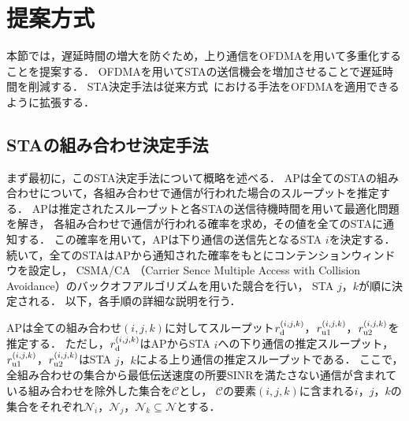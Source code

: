 \documentclass[technicalreport]{ieicej}
\newcommand{\sij}{(i,j)}
\newcommand{\sijk}{(i,j,k)}
\newcommand{\rijk}{r^{(i,j,k)}}
\newcommand{\mthc}{\mathcal C}
\newcommand{\mthni}{{\mathcal N}_i}
\newcommand{\mthnj}{{\mathcal N}_j}
\newcommand{\mthnk}{{\mathcal N}_k}
\def\coloneqq{\mathrel{\mathop:}=}
\begin{document}
\section{提案方式}\label{sec:propose}
	本節では，遅延時間の増大を防ぐため，上り通信をOFDMAを用いて多重化することを提案する．
	OFDMAを用いてSTAの送信機会を増加させることで遅延時間を削減する．
	STA決定手法は従来方式~\cite{promac_fair}における手法をOFDMAを適用できるように拡張する．
	\subsection{STAの組み合わせ決定手法}\label{sec:opt}
		まず最初に，このSTA決定手法について概略を述べる．
		APは全てのSTAの組み合わせについて，各組み合わせで通信が行われた場合のスループットを推定する．
		APは推定されたスループットと各STAの送信待機時間を用いて最適化問題を解き，
		各組み合わせで通信が行われる確率を求め，その値を全てのSTAに通知する．
		この確率を用いて，APは下り通信の送信先となるSTA $i$を決定する．
		続いて，全てのSTAはAPから通知された確率をもとにコンテンションウィンドウを設定し，
		CSMA/CA （Carrier Sence Multiple Access with Collision Avoidance）のバックオフアルゴリズムを用いた競合を行い，
		STA $j$，$k$が順に決定される．
		以下，各手順の詳細な説明を行う．
		\par
		APは全ての組み合わせ$(i,j,k)$に対してスループット$r^{(i,j,k)}_{\rm d}$，$r^{(i,j,k)}_{\rm u1}$，$r^{(i,j,k)}_{\rm u2}$を推定する．
		ただし，$r^{(i,j,k)}_{\rm d}$はAPからSTA $i$への下り通信の推定スループット，$r^{(i,j,k)}_{\rm u1}$，$r^{(i,j,k)}_{\rm u2}$はSTA $j$，$k$による上り通信の推定スループットである．
		ここで，全組み合わせの集合から最低伝送速度の所要SINRを満たさない通信が含まれている組み合わせを除外した集合を$\mthc$とし，
		$\mthc$の要素$\sijk$に含まれる$i$，$j$，$k$の集合をそれぞれ$\mthni$，$\mthnj$，$\mthnk\subseteq{\mathcal N}$とする．
\end{document}
